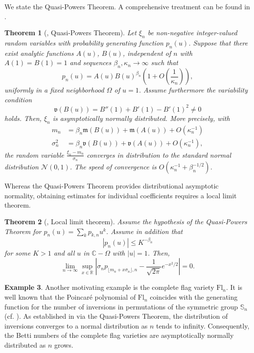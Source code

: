 \documentclass[11pt,letterpaper]{amsart}
\numberwithin{equation}{section}
\newtheorem{theorem}{Theorem}[section]
\theoremstyle{definition}
\newtheorem{example}[theorem]{Example}
\def\CC{\mathbb{C}}
\def\RR{\mathbb{R}}
\newcommand{\cal}{\mathcal}
\def\cN{{\cal N}}
\def\beq{\begin{equation}}
\def\eeq{\end{equation}}
\def\symS{\mathbb{S}}
\begin{document}
We state the Quasi-Powers Theorem. A comprehensive treatment can be found in \cite{FS}.

\begin{theorem}[{\cite[Theorem IX.8]{FS}}, Quasi-Powers Theorem] \label{thm:QPT}
    Let $\xi_n$ be non-negative integer-valued random variables with probability generating function $p_n(u)$. Suppose that there exist analytic functions $A(u)$, $B(u)$, independent of $n$ with $A(1)=B(1)=1$ and sequences $\beta_n, \kappa_n\to \infty$ such that
     \[p_n(u) =A(u)B(u)^{\beta_n} \left(1+O\left(\frac{1}{\kappa_n}\right)\right),\]
   uniformly in a fixed neighborhood $\Omega$ of $u=1$. Assume furthermore the variability condition
   \[ \mathfrak{v}(B(u))=B''(1) +B'(1)-B'(1)^2 \ne 0\]
   holds. Then, $\xi_n$ is asymptotically normally distributed. More precisely, with
   \beq\label{eq:mv}
   \begin{split}
    m_n &= \beta_n \mathfrak{m}(B(u))+\mathfrak{m}(A(u))+O(\kappa_n^{-1}) \\
    \sigma^2_n &= \beta_n \mathfrak{v}(B(u))+\mathfrak{v}(A(u))+O(\kappa_n^{-1}),
    \end{split}
    \eeq
    the random variable $\frac{\xi_n-m_n}{\sigma_n}$ converges in distribution to the standard normal distribution $\cN(0,1)$. The speed of convergence is $O(\kappa_n^{-1} + \beta_n^{-1/2})$.

\end{theorem}

Whereas the Quasi-Powers Theorem provides distributional asymptotic normality, obtaining estimates for individual coefficients requires a local limit theorem.

\begin{theorem}[{\cite[Theorem IX.14]{FS}}, Local limit theorem] \label{thm:LLT}
    Assume the hypothesis of the Quasi-Powers Theorem for $p_n(u)=\sum_k p_{k,n}u^k$. Assume in addition that
    \[ |p_n(u)|\le K^{-\beta_n} \]
    for some $K>1$ and all $u$ in $\CC-\Omega$ with $|u|=1$.  Then,
    \[ \lim_{n\to \infty} \sup_{x\in \RR} \left| \sigma_n p_{\lfloor m_n +x\sigma_n \rfloor,n} - \frac{1}{\sqrt{2\pi}}e^{-x^2/2} \right| =0.\]
\end{theorem}




\begin{example}
   Another motivating example is the complete flag variety $\mathrm{Fl}_n$. It is well known that the Poincaré polynomial of $\mathrm{Fl}_n$ coincides with the generating function for the number of inversions in permutations of the symmetric group $\symS_n$ (cf. \cite{Fulton}). As established in \cite{Hwang, Mar} via the Quasi-Powers Theorem, the distribution of inversions converges to a normal distribution as $n$ tends to infinity. Consequently, the Betti numbers of the complete flag varieties are asymptotically normally distributed as $n$ grows.
\end{example}
\end{document}
